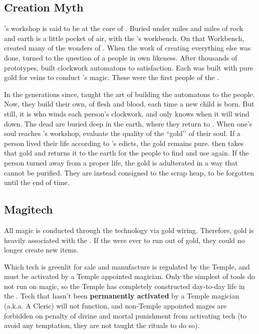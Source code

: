 \documentclass[blue]{GL2020}
\begin{document}
\subsection*{Creation Myth}
\cTechGod{}’s workshop is said to be at the core of \pEarth{}. Buried under miles and miles of rock and earth is a little pocket of air, with the \cTechGod{\God}’s workbench. On that Workbench, \cTechGod{} created many of the wonders of \pEarth{}. When the work of creating everything else was done, \cTechGod{} turned to the question of a people in \cTechGod{\their} own likeness. After thousands of prototypes, \cTechGod{} built clockwork automatons to \cTechGod{\their} satisfaction. Each was built with pure gold for veins to conduct \cTechGod{}’s magic. These were the first people of the \pTech{}.

In the generations since, \cTechGod{} taught the art of building the automatons to the people. Now, they build their own, of flesh and blood, each time a new child is born. But still, it is \cTechGod{} who winds each person’s clockwork, and only \cTechGod{} knows when it will wind down. The dead are buried deep in the earth, where they return to \cTechGod{}. When one’s soul reaches \cTechGod{}’s workshop, \cTechGod{\they} evaluate\cTechGod{\plural} the quality of the ``gold’’ of their soul. If a person lived their life according to \cTechGod{}’s edicts, the gold remains pure. \cTechGod{} then takes that gold and returns it to the earth for the people to find and use again. If the person turned away from a proper life, the gold is adulterated in a way that cannot be purified. They are instead consigned to the scrap heap, to be forgotten until the end of time.

\subsection*{Magitech}
All magic is conducted through the technology via gold wiring. Therefore, gold is heavily associated with the \pTech{}. If the \pTechies{} were ever to run out of gold, they could no longer create new items.

Which tech is greenlit for sale and manufacture is regulated by the Temple, and must be activated by a Temple appointed magician. Only the simplest of tools do not run on magic, so the Temple has completely constructed day-to-day life in the \pTech{}. Tech that hasn't been \textbf{permanently activated} by a Temple magician (a.k.a. A Cleric) will not function, and non-Temple appointed mages are forbidden on penalty of divine and mortal punishment from activating tech (to avoid any temptation, they are not taught the rituals to do so).
\end{document}

